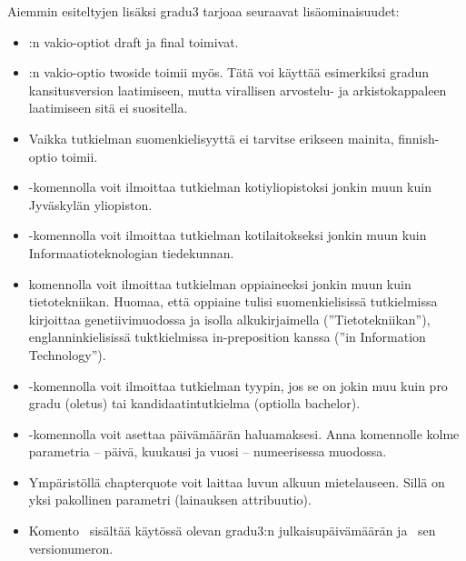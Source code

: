 \documentclass[utf8,bachelor]{gradu3}
\begin{document}
Aiemmin esiteltyjen lisäksi gradu3 tarjoaa seuraavat lisäominaisuudet:
\begin{itemize}
\item \LaTeXe:n vakio-optiot draft ja final toimivat.
\item \LaTeXe:n vakio-optio twoside toimii myös.  Tätä voi käyttää
  esimerkiksi gradun kansitusversion laatimiseen, mutta virallisen
  arvostelu- ja arkistokappaleen laatimiseen sitä ei suositella.
\item Vaikka tutkielman suomenkielisyyttä ei tarvitse erikseen
  mainita, finnish-optio toimii.
\item \string\university-komennolla voit ilmoittaa tutkielman
  kotiyliopistoksi jonkin muun kuin Jyväskylän yliopiston.
\item  \string\department-komennolla voit ilmoittaa tutkielman
  kotilaitokseksi jonkin muun kuin Informaatioteknologian tiedekunnan.
\item \string\subject-komennolla voit ilmoittaa tutkielman
  oppiaineeksi jonkin muun kuin tietotekniikan.  Huomaa, että oppiaine
  tulisi suomenkielisissä tutkielmissa kirjoittaa genetiivimuodossa ja
  isolla alkukirjaimella (''Tietotekniikan''), englanninkielisissä
  tuktkielmissa in-preposition kanssa (''in Information Technology'').
\item \string\type-komennolla voit ilmoittaa tutkielman tyypin, jos se
  on jokin muu kuin pro gradu (oletus) tai kandidaatintutkielma
  (optiolla bachelor).
\item \string\setdate-komennolla voit asettaa päivämäärän
  haluamaksesi.  Anna komennolle kolme parametria -- päivä,
  kuukausi ja vuosi -- numeerisessa muodossa.
\item Ympäristöllä chapterquote voit laittaa luvun alkuun
  mietelauseen.  Sillä on yksi pakollinen parametri (lainauksen
  attribuutio).
\item Komento \string\graduclsdate\ sisältää käytössä olevan gradu3:n
  julkaisupäivämäärän ja \string\graduclsversion\ sen versionumeron.
\end{itemize}
\end{document}

